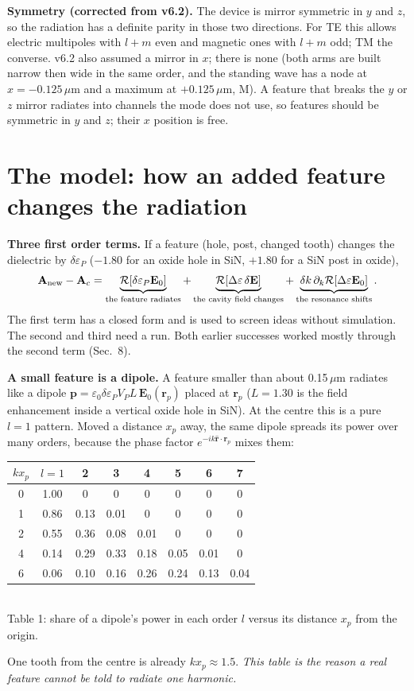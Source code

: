 \documentclass[11pt,a4paper]{article}
\begin{document}
\textbf{Symmetry (corrected from v6.2).} The device is mirror symmetric in $y$ and $z$, so the radiation has a definite
parity in those two directions. For TE this allows electric multipoles with $l+m$ even and magnetic ones with $l+m$ odd;
TM the converse. v6.2 also assumed a mirror in $x$; there is none (both arms are built narrow then wide in the same
order, and the standing wave has a node at $x=-0.125$\,$\mu$m and a maximum at $+0.125$\,$\mu$m, M). A feature that breaks
the $y$ or $z$ mirror radiates into channels the mode does not use, so features should be symmetric in $y$ and $z$;
their $x$ position is free.

\section{The model: how an added feature changes the radiation}
\textbf{Three first order terms.} If a feature (hole, post, changed tooth) changes the dielectric by $\delta\varepsilon_P$
($-1.80$ for an oxide hole in SiN, $+1.80$ for a SiN post in oxide),
\begin{equation}
\mathbf A_{\rm new}-\mathbf A_c=\underbrace{\mathcal R[\delta\varepsilon_P\mathbf E_0]}_{\text{the feature radiates}}
+\underbrace{\mathcal R[\Delta\varepsilon\,\delta\mathbf E]}_{\text{the cavity field changes}}
+\underbrace{\delta k\,\partial_k\mathcal R[\Delta\varepsilon\mathbf E_0]}_{\text{the resonance shifts}} .
\end{equation}
The first term has a closed form and is used to screen ideas without simulation. The second and third need a run.
Both earlier successes worked mostly through the second term (Sec.~8).

\textbf{A small feature is a dipole.} A feature smaller than about 0.15\,$\mu$m radiates like a dipole
$\mathbf p=\varepsilon_0\delta\varepsilon_PV_PL\,\mathbf E_0(\mathbf r_p)$ placed at $\mathbf r_p$ ($L=1.30$ is the field
enhancement inside a vertical oxide hole in SiN). At the centre this is a pure $l=1$ pattern. Moved a distance $x_p$ away,
the same dipole spreads its power over many orders, because the phase factor $e^{-ik\hat{\mathbf r}\cdot\mathbf r_p}$
mixes them:
\begin{center}\small\begin{tabular}{cccccccc}\hline
$kx_p$ & $l=1$ & 2 & 3 & 4 & 5 & 6 & 7\\\hline
0 & 1.00 & 0 & 0 & 0 & 0 & 0 & 0\\
1 & 0.86 & 0.13 & 0.01 & 0 & 0 & 0 & 0\\
2 & 0.55 & 0.36 & 0.08 & 0.01 & 0 & 0 & 0\\
4 & 0.14 & 0.29 & 0.33 & 0.18 & 0.05 & 0.01 & 0\\
6 & 0.06 & 0.10 & 0.16 & 0.26 & 0.24 & 0.13 & 0.04\\\hline
\end{tabular}\\[2pt]Table 1: share of a dipole's power in each order $l$ versus its distance $x_p$ from the origin.\end{center}
One tooth from the centre is already $kx_p\approx1.5$. \emph{This table is the reason a real feature cannot be told to
radiate one harmonic.}
\end{document}
